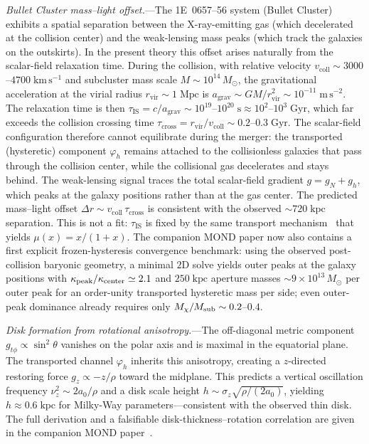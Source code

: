 \documentclass[aps,prd,onecolumn,superscriptaddress,nofootinbib,showpacs,12pt]{revtex4-2}
\begin{document}
\textit{Bullet Cluster mass--light offset.}---The
1E~0657--56 system (Bullet Cluster)~\cite{Clowe2006} exhibits
a spatial separation between the X-ray-emitting gas
(which decelerated at the collision center) and the
weak-lensing mass peaks (which track the galaxies on
the outskirts).  In the present theory this offset arises
naturally from the scalar-field relaxation time.  During
the collision, with relative velocity
$v_{\mathrm{coll}} \sim 3000$--$4700\;\mathrm{km\,s^{-1}}$
and subcluster mass scale $M \sim 10^{14}\,M_{\odot}$, the
gravitational acceleration at the virial radius
$r_{\mathrm{vir}} \sim 1\;\mathrm{Mpc}$ is
$a_{\mathrm{grav}} \sim GM/r_{\mathrm{vir}}^{2}
\sim 10^{-11}\;\mathrm{m\,s^{-2}}$.
The relaxation time is then
$\tau_{\mathrm{IS}} = c/a_{\mathrm{grav}}
\sim 10^{19}$--$10^{20}\;\mathrm{s}
\approx 10^{2}$--$10^{3}\;\mathrm{Gyr}$,
which far exceeds the collision crossing time
$\tau_{\mathrm{cross}} = r_{\mathrm{vir}}/v_{\mathrm{coll}}
\sim 0.2$--$0.3\;\mathrm{Gyr}$.  The scalar-field configuration
therefore cannot equilibrate during the merger:
the transported (hysteretic) component $\varphi_{h}$
remains attached to the collisionless galaxies that pass
through the collision center, while the collisional gas
decelerates and stays behind.  The weak-lensing signal
traces the total scalar-field gradient
$g = g_{N} + g_{h}$, which peaks at the galaxy positions
rather than at the gas center.  The predicted
mass--light offset
$\Delta r \sim v_{\mathrm{coll}}\,\tau_{\mathrm{cross}}$
is consistent with the observed
${\sim}720\;\mathrm{kpc}$ separation.  This
is not a fit: $\tau_{\mathrm{IS}}$ is fixed by the
same transport mechanism~\cite{Lotishvili2026MOND} that yields
$\mu(x) = x/(1+x)$.  The companion MOND paper now also
contains a first explicit frozen-hysteresis convergence
benchmark: using the observed post-collision baryonic
geometry, a minimal $2$D solve yields outer peaks at the
galaxy positions with
$\kappa_{\rm peak}/\kappa_{\rm center}\simeq2.1$ and
$250\;\mathrm{kpc}$ aperture masses
$\sim9\times10^{13}\,M_\odot$ per outer peak for an
order-unity transported hysteretic mass per side; even
outer-peak dominance already requires only
$M_\chi/M_{\rm sub}\sim0.2$--$0.4$.

\textit{Disk formation from rotational anisotropy.}---The
off-diagonal metric component $g_{t\phi} \propto \sin^{2}\theta$
vanishes on the polar axis and is maximal in the equatorial
plane.  The transported channel $\varphi_{h}$ inherits this
anisotropy, creating a $z$-directed restoring force
$g_{z} \propto -z/\rho$ toward the midplane.
This predicts a vertical oscillation frequency
$\nu_{z}^{2} \sim 2a_{0}/\rho$ and a disk scale height
$h \sim \sigma_{z}\sqrt{\rho/(2a_{0})}$, yielding
$h \approx 0.6\;\mathrm{kpc}$ for Milky-Way parameters---consistent with the observed thin disk.  The full
derivation and a falsifiable disk-thickness--rotation
correlation are given in the companion MOND paper~\cite{Lotishvili2026MOND}.
\end{document}
